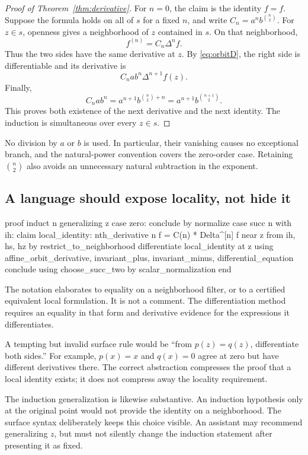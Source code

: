 \documentclass[11pt,a4paper]{article}
\newcommand{\code}[1]{\texttt{\detokenize{#1}}}
\theoremstyle{remark}
\begin{document}
\begin{proof}[Proof of Theorem~\ref{thm:derivative}]
For \(n=0\), the claim is the identity \(f=f\). Suppose the formula holds on all of \(s\) for a fixed \(n\), and write
\(C_n=a^n b^{\binom n2}\). For \(z\in s\), openness gives a neighborhood of \(z\) contained in \(s\). On that neighborhood,
\[
 f^{(n)}=C_n\Delta^n f.
\]
Thus the two sides have the same derivative at \(z\). By \eqref{eq:orbitD}, the right side is differentiable and its derivative is
\[
 C_n a b^n\Delta^{n+1}f(z).
\]
Finally,
\[
 C_n a b^n
 =a^{n+1}b^{\binom n2+n}
 =a^{n+1}b^{\binom{n+1}2}.
\]
This proves both existence of the next derivative and the next identity. The induction is simultaneous over every \(z\in s\).
\end{proof}

No division by \(a\) or \(b\) is used. In particular, their vanishing causes no exceptional branch, and the natural-power convention covers the zero-order case. Retaining \(\binom n2\) also avoids an unnecessary natural subtraction in the exponent.

\subsection{A language should expose locality, not hide it}

\begin{Code}
proof
  induct n generalizing z
  case zero: conclude by normalize
  case succ n with ih:
    claim local_identity:
      nth_derivative n f = C(n) * Delta^[n] f near z
      from ih, hs, hz by restrict_to_neighborhood
    differentiate local_identity at z
      using affine_orbit_derivative, invariant_plus,
            invariant_minus, differential_equation
    conclude using choose_succ_two by scalar_normalization
end
\end{Code}
The notation \code{near z} elaborates to equality on a neighborhood filter, or to a certified equivalent local formulation. It is not a comment. The differentiation method requires an equality in that form and derivative evidence for the expressions it differentiates.

A tempting but invalid surface rule would be ``from \(p(z)=q(z)\), differentiate both sides.'' For example, \(p(x)=x\) and \(q(x)=0\) agree at zero but have different derivatives there. The correct abstraction compresses the proof that a local identity exists; it does not compress away the locality requirement.

The induction generalization is likewise substantive. An induction hypothesis only at the original point would not provide the identity on a neighborhood. The surface syntax deliberately keeps this choice visible. An assistant may recommend generalizing \(z\), but must not silently change the induction statement after presenting it as fixed.
\end{document}
